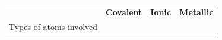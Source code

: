 \begin{enumerate}[noitemsep, label=\textbf{\arabic*}. ]
{{\begin{center}
    \noindent
      \tablelasttail{}
      \begin{xtabular}[t]{|l|l|l|l|}\hline
    
    
         &
    
    
        \textbf{Covalent} &
    
    
        \textbf{Ionic} &
    
    
        \textbf{Metallic}%
     \tabularnewline{}
    
    
        Types of atoms involved &
    
    
         &
    
    
         &
    
    

\end{xtabular}
\end{center}}}
\end{enumerate}
